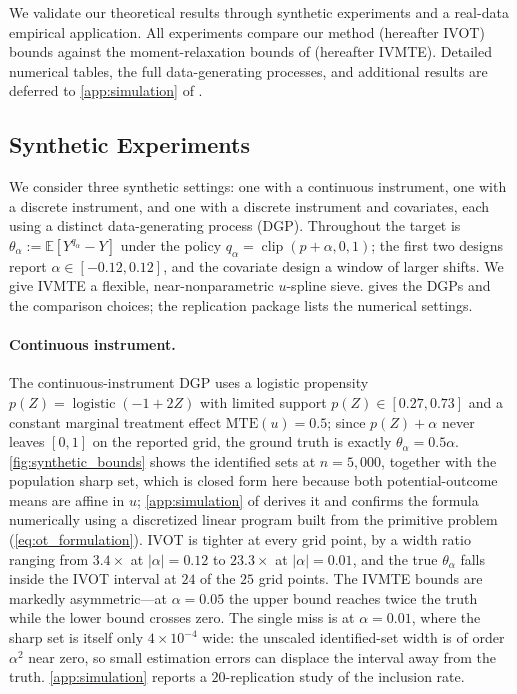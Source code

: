 

We validate our theoretical results through synthetic experiments and a real-data empirical application. All experiments compare our method (hereafter IVOT) bounds against the moment-relaxation bounds of \citet{magne2018using} (hereafter IVMTE). Detailed numerical tables, the full data-generating processes, and additional results are deferred to \cref{app:simulation} of \oalocation.

\subsection{Synthetic Experiments}\label{sec:sim_synthetic}

We consider three synthetic settings: one with a continuous instrument, one with a discrete instrument, and one with a discrete instrument and covariates, each using a distinct data-generating process (DGP). Throughout the target is $\theta_\alpha := \mathbb{E}[Y^{q_\alpha} - Y]$ under the policy $q_\alpha = \operatorname{clip}(p+\alpha, 0, 1)$; the first two designs report $\alpha \in [-0.12, 0.12]$, and the covariate design a window of larger shifts. We give IVMTE a flexible, near-nonparametric $u$-spline sieve.  gives the DGPs and the comparison choices; the replication package lists the numerical settings.

\paragraph{Continuous instrument.}
The continuous-instrument DGP uses a logistic propensity $p(Z) = \operatorname{logistic}(-1+2Z)$ with limited support $p(Z) \in [0.27, 0.73]$ and a constant marginal treatment effect $\text{MTE}(u) = 0.5$; since $p(Z)+\alpha$ never leaves $[0,1]$ on the reported grid, the ground truth is exactly $\theta_\alpha = 0.5\alpha$. \cref{fig:synthetic_bounds} shows the identified sets at $n = 5{,}000$, together with the population sharp set, which is closed form here because both potential-outcome means are affine in $u$; \cref{app:simulation} of \oalocation{} derives it and confirms the formula numerically using a discretized linear program built from the primitive problem (\ref{eq:ot_formulation}). IVOT is tighter at every grid point, by a width ratio ranging from $3.4\times$ at $|\alpha| = 0.12$ to $23.3\times$ at $|\alpha| = 0.01$, and the true $\theta_\alpha$ falls inside the IVOT interval at $24$ of the $25$ grid points. The IVMTE bounds are markedly asymmetric---at $\alpha = 0.05$ the upper bound reaches twice the truth while the lower bound crosses zero. The single miss is at $\alpha = 0.01$, where the sharp set is itself only $4 \times 10^{-4}$ wide: the unscaled identified-set width is of order $\alpha^2$ near zero, so small estimation errors can displace the interval away from the truth. \cref{app:simulation} reports a $20$-replication study of the inclusion rate.

